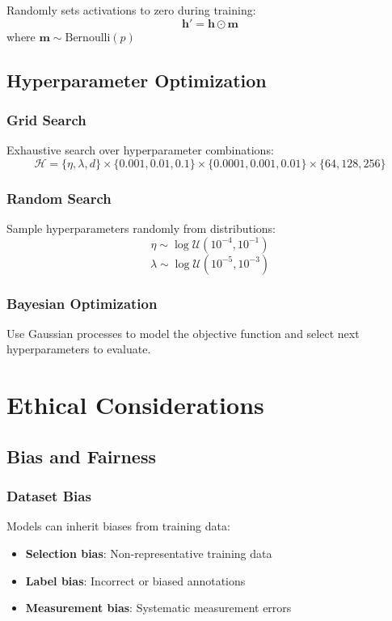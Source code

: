 \documentclass{article}
\begin{document}
Randomly sets activations to zero during training:
\[
\mathbf{h}' = \mathbf{h} \odot \mathbf{m}
\]
where $\mathbf{m} \sim \text{Bernoulli}(p)$

\subsection{Hyperparameter Optimization}

\subsubsection{Grid Search}

Exhaustive search over hyperparameter combinations:
\[
\mathcal{H} = \{\eta, \lambda, d\} \times \{0.001, 0.01, 0.1\} \times \{0.0001, 0.001, 0.01\} \times \{64, 128, 256\}
\]

\subsubsection{Random Search}

Sample hyperparameters randomly from distributions:
\[
\eta \sim \log\mathcal{U}(10^{-4}, 10^{-1})
\]
\[
\lambda \sim \log\mathcal{U}(10^{-5}, 10^{-3})
\]

\subsubsection{Bayesian Optimization}

Use Gaussian processes to model the objective function and select
next hyperparameters to evaluate.

\section{Ethical Considerations}

\subsection{Bias and Fairness}

\subsubsection{Dataset Bias}

Models can inherit biases from training data:
\begin{itemize}
\item \textbf{Selection bias}: Non-representative training data
\item \textbf{Label bias}: Incorrect or biased annotations
\item \textbf{Measurement bias}: Systematic measurement errors
\end{itemize}
\end{document}
